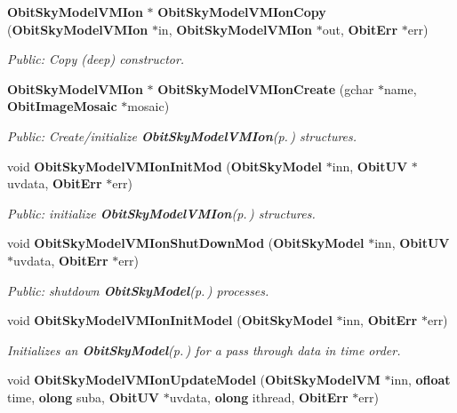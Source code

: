 \begin{CompactItemize}
{\bf Obit\-Sky\-Model\-VMIon} $\ast$ {\bf Obit\-Sky\-Model\-VMIon\-Copy} ({\bf Obit\-Sky\-Model\-VMIon} $\ast$in, {\bf Obit\-Sky\-Model\-VMIon} $\ast$out, {\bf Obit\-Err} $\ast$err)
\begin{CompactList}\small\item\em Public: Copy (deep) constructor. \item\end{CompactList}\item 
{\bf Obit\-Sky\-Model\-VMIon} $\ast$ {\bf Obit\-Sky\-Model\-VMIon\-Create} (gchar $\ast$name, {\bf Obit\-Image\-Mosaic} $\ast$mosaic)
\begin{CompactList}\small\item\em Public: Create/initialize {\bf Obit\-Sky\-Model\-VMIon}{\rm (p.\,\pageref{structObitSkyModelVMIon})} structures. \item\end{CompactList}\item 
void {\bf Obit\-Sky\-Model\-VMIon\-Init\-Mod} ({\bf Obit\-Sky\-Model} $\ast$inn, {\bf Obit\-UV} $\ast$uvdata, {\bf Obit\-Err} $\ast$err)
\begin{CompactList}\small\item\em Public: initialize {\bf Obit\-Sky\-Model\-VMIon}{\rm (p.\,\pageref{structObitSkyModelVMIon})} structures. \item\end{CompactList}\item 
void {\bf Obit\-Sky\-Model\-VMIon\-Shut\-Down\-Mod} ({\bf Obit\-Sky\-Model} $\ast$inn, {\bf Obit\-UV} $\ast$uvdata, {\bf Obit\-Err} $\ast$err)
\begin{CompactList}\small\item\em Public: shutdown {\bf Obit\-Sky\-Model}{\rm (p.\,\pageref{structObitSkyModel})} processes. \item\end{CompactList}\item 
void {\bf Obit\-Sky\-Model\-VMIon\-Init\-Model} ({\bf Obit\-Sky\-Model} $\ast$inn, {\bf Obit\-Err} $\ast$err)
\begin{CompactList}\small\item\em Initializes an {\bf Obit\-Sky\-Model}{\rm (p.\,\pageref{structObitSkyModel})} for a pass through data in time order. \item\end{CompactList}\item 
void {\bf Obit\-Sky\-Model\-VMIon\-Update\-Model} ({\bf Obit\-Sky\-Model\-VM} $\ast$inn, {\bf ofloat} time, {\bf olong} suba, {\bf Obit\-UV} $\ast$uvdata, {\bf olong} ithread, {\bf Obit\-Err} $\ast$err)

\end{CompactItemize}
